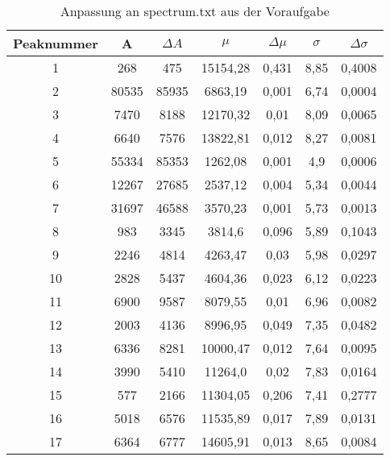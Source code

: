 \documentclass{article}
\begin{document}
\begin{table}
  \centering
  \begin{tabular}{|c|c|c|c|c|c|c|} \hline
    Peaknummer & A & $\Delta A$ & $\mu$ & $\Delta \mu$ & $\sigma$ & $\Delta \sigma$\\ \hline \hline
    1 & 268 & 475 & 15154,28 & 0,431 & 8,85 & 0,4008 \\ \hline
    2 & 80535 & 85935 & 6863,19 & 0,001 & 6,74 & 0,0004 \\ \hline
    3 & 7470 & 8188 & 12170,32 & 0,01 & 8,09 & 0,0065 \\ \hline
    4 & 6640 & 7576 & 13822,81 & 0,012 & 8,27 & 0,0081 \\ \hline
    5 & 55334 & 85353 & 1262,08 & 0,001 & 4,9 & 0,0006 \\ \hline
    6 & 12267 & 27685 & 2537,12 & 0,004 & 5,34 & 0,0044 \\ \hline
    7 & 31697 & 46588 & 3570,23 & 0,001 & 5,73 & 0,0013 \\ \hline
    8 & 983 & 3345 & 3814,6 & 0,096 & 5,89 & 0,1043 \\ \hline
    9 & 2246 & 4814 & 4263,47 & 0,03 & 5,98 & 0,0297 \\ \hline
    10 & 2828 & 5437 & 4604,36 & 0,023 & 6,12 & 0,0223 \\ \hline
    11 & 6900 & 9587 & 8079,55 & 0,01 & 6,96 & 0,0082 \\ \hline
    12 & 2003 & 4136 & 8996,95 & 0,049 & 7,35 & 0,0482 \\ \hline
    13 & 6336 & 8281 & 10000,47 & 0,012 & 7,64 & 0,0095 \\ \hline
    14 & 3990 & 5410 & 11264,0 & 0,02 & 7,83 & 0,0164 \\ \hline
    15 & 577 & 2166 & 11304,05 & 0,206 & 7,41 & 0,2777 \\ \hline
    16 & 5018 & 6576 & 11535,89 & 0,017 & 7,89 & 0,0131 \\ \hline
    17 & 6364 & 6777 & 14605,91 & 0,013 & 8,65 & 0,0084 \\ \hline

  \end{tabular}
  \caption{Anpassung an spectrum.txt aus der Voraufgabe}
  \label{tab:voraufgabe}
\end{table}

\newpage
\printbibliography[heading=bibintoc]
\end{document}
